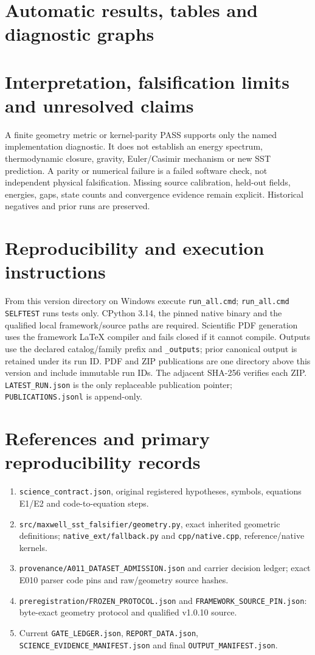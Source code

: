 \documentclass[10pt,a4paper]{article}
\begin{document}
\section{Automatic results, tables and diagnostic graphs}

\section{Interpretation, falsification limits and unresolved claims}
A finite geometry metric or kernel-parity PASS supports only the named implementation diagnostic. It does not establish an energy spectrum, thermodynamic closure, gravity, Euler/Casimir mechanism or new SST prediction. A parity or numerical failure is a failed software check, not independent physical falsification. Missing source calibration, held-out fields, energies, gaps, state counts and convergence evidence remain explicit. Historical negatives and prior runs are preserved.
\section{Reproducibility and execution instructions}
From this version directory on Windows execute \texttt{run\_all.cmd}; \texttt{run\_all.cmd SELFTEST} runs tests only. CPython 3.14, the pinned native binary and the qualified local framework/source paths are required. Scientific PDF generation uses the framework LaTeX compiler and fails closed if it cannot compile. Outputs use the declared catalog/family prefix and \texttt{\_outputs}; prior canonical output is retained under its run ID. PDF and ZIP publications are one directory above this version and include immutable run IDs. The adjacent SHA-256 verifies each ZIP. \texttt{LATEST\_RUN.json} is the only replaceable publication pointer; \texttt{PUBLICATIONS.jsonl} is append-only.
\section{References and primary reproducibility records}
\begin{enumerate}
\item \texttt{science\_contract.json}, original registered hypotheses, symbols, equations E1/E2 and code-to-equation steps.
\item \texttt{src/maxwell\_sst\_falsifier/geometry.py}, exact inherited geometric definitions; \texttt{native\_ext/fallback.py} and \texttt{cpp/native.cpp}, reference/native kernels.
\item \texttt{provenance/A011\_DATASET\_ADMISSION.json} and carrier decision ledger; exact E010 parser code pins and raw/geometry source hashes.
\item \texttt{preregistration/FROZEN\_PROTOCOL.json} and \texttt{FRAMEWORK\_SOURCE\_PIN.json}: byte-exact geometry protocol and qualified v1.0.10 source.
\item Current \texttt{GATE\_LEDGER.json}, \texttt{REPORT\_DATA.json},\\\texttt{SCIENCE\_EVIDENCE\_MANIFEST.json} and final \texttt{OUTPUT\_MANIFEST.json}.
\end{enumerate}
\end{document}

